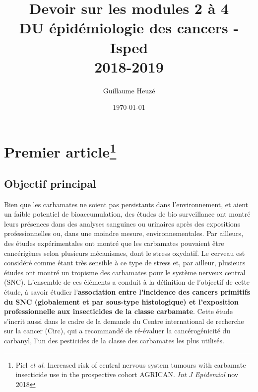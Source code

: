 \documentclass[10pt]{article}
\begin{document}
\title{Devoir sur les modules 2 à 4\\
\small{DU épidémiologie des cancers - Isped\\
2018-2019}}
\author{Guillaume Heuzé}
\date{\today}
\maketitle

\section{Premier article\protect\footnote{Piel \emph{et al}. Increased risk of central nervous system tumours with carbamate insecticide use in the prospective cohort AGRICAN. \emph{Int J Epidemiol} nov 2018}}

\subsection{Objectif principal}
Bien que les carbamates ne soient pas persistants dans l'environnement, et aient un faible potentiel de bioaccumulation, des études de bio surveillance ont montré leurs présences dans des analyses sanguines ou urinaires après des expositions professionnelles ou, dans une moindre mesure, environnementales. Par ailleurs, des études expérimentales ont montré que les carbamates pouvaient être cancérigènes selon plusieurs mécanismes, dont le stress oxydatif. Le cerveau est considéré comme étant très sensible à ce type de stress et, par ailleur, plusieurs études ont montré un tropisme des carbamates pour le système nerveux central (SNC). L'ensemble de ces éléments a conduit à la définition de l'objectif de cette étude, à savoir étudier l'\textbf{association entre l'incidence des cancers primitifs du SNC (globalement et par sous-type histologique) et l'exposition professionnelle aux insecticides de la classe carbamate}. Cette étude s'incrit aussi dans le cadre de la demande du Centre international de recherche sur la cancer (Circ), qui a recommandé de ré-évaluer la cancérogénicité du carbanyl, l'un des pesticides de la classe des carbamates les plus utilisés.
\end{document}
